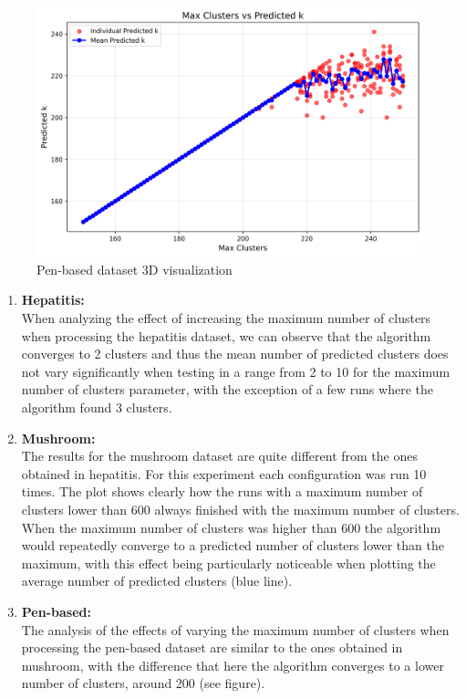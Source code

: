 \begin{figure}[H]
    \centering
    \includegraphics[width=0.6\linewidth]{figures/XMeans/pen-based_max_k_vs_predicted_k.png}
    \caption{Pen-based dataset 3D visualization}
\end{figure}

\begin{enumerate}
    \item \textbf{Hepatitis:}
    \\ When analyzing the effect of increasing the maximum number of clusters when processing the hepatitis dataset, we can observe that the algorithm converges to 2 clusters and thus the mean number of predicted clusters does not vary significantly when testing in a range from 2 to 10 for the maximum number of clusters parameter, with the exception of a few runs where the algorithm found 3 clusters.

    \item \textbf{Mushroom:}
    \\ The results for the mushroom dataset are quite different from the ones obtained in hepatitis. For this experiment each configuration was run 10 times. The plot shows clearly how the runs with a maximum number of clusters lower than 600 always finished with the maximum number of clusters. When the maximum number of clusters was higher than 600 the algorithm would repeatedly converge to a predicted number of clusters lower than the maximum, with this effect being particularly noticeable when plotting the average number of predicted clusters (blue line).

    \item \textbf{Pen-based:}
    \\ The analysis of the effects of varying the maximum number of clusters when processing the pen-based dataset are similar to the ones obtained in mushroom, with the difference that here the algorithm converges to a lower number of clusters, around 200 (see figure).

\end{enumerate}

